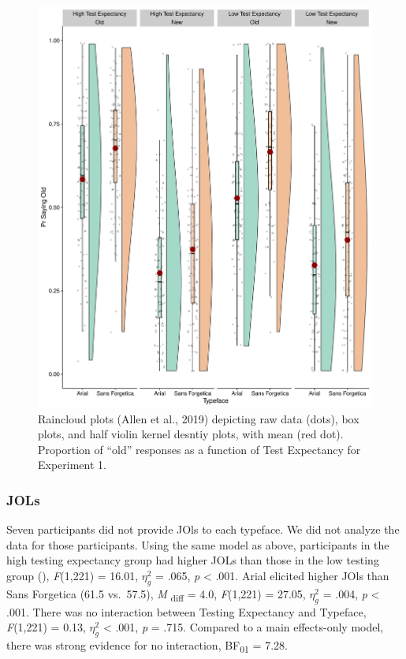 \documentclass[
  english,
  jou]{apa6}
\begin{document}
\begin{figure}

{\centering \includegraphics{Testing_Expectancy_SF_files/figure-latex/unnamed-chunk-8-1} 

}

\caption{Raincloud plots (Allen et al., 2019) depicting raw data (dots), box plots, and half violin kernel desntiy plots, with mean (red dot). Proportion of “old” responses as a function of Test Expectancy for Experiment 1.}\label{fig:unnamed-chunk-8}
\end{figure}

\hypertarget{jols}{%
\subsubsection{JOLs}\label{jols}}

Seven participants did not provide JOls to each typeface. We did not analyze the data for those participants. Using the same model as above, participants in the high testing expectancy group had higher JOLs than those in the low testing group (), \emph{F}(1,221) = 16.01, \(\eta_{g}^{2}\) = .065, \emph{p} \textless{} .001. Arial elicited higher JOls than Sans Forgetica (61.5 vs.~57.5), \emph{M} \textsubscript{diff} = 4.0, \emph{F}(1,221) = 27.05, \(\eta_{g}^{2}\) = .004, \emph{p} \textless{} .001. There was no interaction between Testing Expectancy and Typeface, \emph{F}(1,221) = 0.13, \(\eta_{g}^{2}\) \textless{} .001, \emph{p} = .715. Compared to a main effects-only model, there was strong evidence for no interaction, BF\textsubscript{01} = 7.28.
\end{document}
